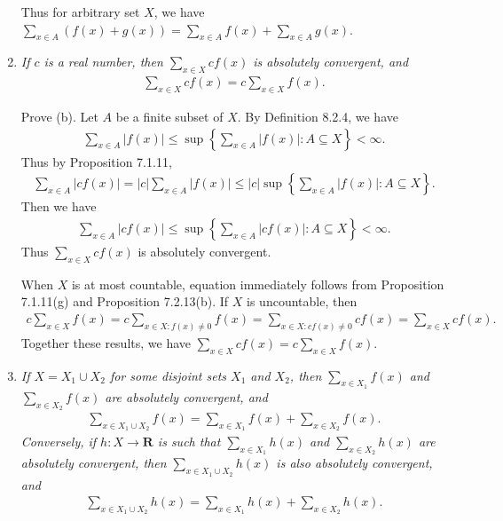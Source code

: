 \documentclass{book}
\begin{document}
\begin{enumerate}
    Thus for arbitrary set $X$, we have $\sum_{x\in A}(f(x)+g(x))=\sum_{x\in A}f(x)+\sum_{x\in A}g(x)$.

    \item \emph{If $c$ is a real number, then $\sum_{x\in X}cf(x)$ is absolutely convergent, and}
        \begin{align*}
            \sum_{x\in X}cf(x)=c\sum_{x\in X}f(x).
        \end{align*}

    Prove (b). Let $A$ be a finite subset of $X$. By Definition 8.2.4, we have
        \begin{align*}
            \sum_{x\in A}|f(x)|\leq\sup\left\{\sum_{x\in A}|f(x)|:A\subseteq X\right\}<\infty.
        \end{align*}
    Thus by Proposition 7.1.11,
        \begin{align*}
            \sum_{x\in A}|cf(x)|=|c|\sum_{x\in A}|f(x)|\leq|c|\sup\left\{\sum_{x\in A}|f(x)|:A\subseteq X\right\}.
        \end{align*}
    Then we have
        \begin{align*}
            \sum_{x\in A}|cf(x)|\leq\sup\left\{\sum_{x\in A}|cf(x)|:A\subseteq X\right\}<\infty.
        \end{align*}
    Thus $\sum_{x\in X}cf(x)$ is absolutely convergent.

    When $X$ is at most countable, equation immediately follows from Proposition 7.1.11(g) and Proposition 7.2.13(b). If $X$ is uncountable, then
        \begin{align*}
            c\sum_{x\in X}f(x)=c\sum_{x\in X:f(x)\neq 0}f(x)=\sum_{x\in X:cf(x)\neq 0}cf(x)=\sum_{x\in X}cf(x).
        \end{align*}
    Together these results, we have $\sum_{x\in X}cf(x)=c\sum_{x\in X}f(x)$.

    \item \emph{If $X=X_1\cup X_2$ for some disjoint sets $X_1$ and $X_2$, then $\sum_{x\in X_1}f(x)$ and $\sum_{x\in X_2}f(x)$ are absolutely convergent, and}
        \begin{align*}
            \sum_{x\in X_1\cup X_2}f(x)=\sum_{x\in X_1}f(x)+\sum_{x\in X_2}f(x).
        \end{align*}
    \emph{Conversely, if $h:X\to\mathbf{R}$ is such that $\sum_{x\in X_1}h(x)$ and $\sum_{x\in X_2}h(x)$ are absolutely convergent, then $\sum_{x\in X_1\cup X_2}h(x)$ is also absolutely convergent, and}
        \begin{align*}
            \sum_{x\in X_1\cup X_2}h(x)=\sum_{x\in X_1}h(x)+\sum_{x\in X_2}h(x).
        \end{align*}


\end{enumerate}
\end{document}
